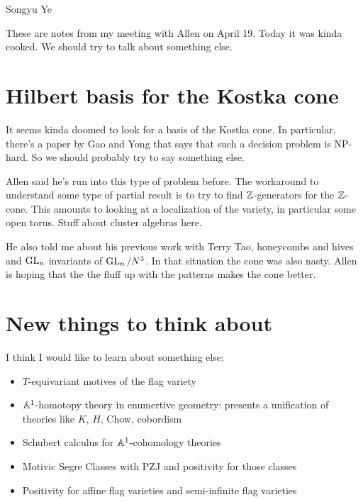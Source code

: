 \documentclass[12pt]{article}
\begin{document}
Songyu Ye

These are notes from my meeting with Allen on April 19.
Today it was kinda cooked. We should try to talk about something else.

\section{Hilbert basis for the Kostka cone}
It seems kinda doomed to look for a basis of the Kostka cone.
In particular, there's a paper by Gao and Yong that says that
such a decision problem is NP-hard. So we should probably try to say something else.

\hfill

Allen said he's run into this type of problem before. The workaround to understand some type of partial 
result is to try to find $\mathbb{Z}$-generators for the $\mathbb{Z}$-cone. This amounts to 
looking at a localization of the variety, in particular some open torus. Stuff about cluster algebras here.

\hfill

He also told me about his previous work with Terry Tao, honeycombs and hives and $\operatorname{GL}_n$ invariants of $\operatorname{GL}_n/N^3$. In that situation the cone was also nasty. 
Allen is hoping that the the fluff up with the patterns makes the cone better.

\section{New things to think about}
I think I would like to learn about something else:

\begin{itemize}
    \item $T$-equivariant motives of the flag variety
    \item $\mathbb{A}^1$-homotopy theory in enumertive geometry: presents 
    a unification of theories like $K$, $H$, Chow, cobordism
    \item Schubert calculus for $\mathbb{A}^1$-cohomology theories
    \item Motivic Segre Classes with PZJ and positivity for those classes
    \item Positivity for affine flag varieties and 
    semi-infinite flag varieties
\end{itemize}
\end{document}
